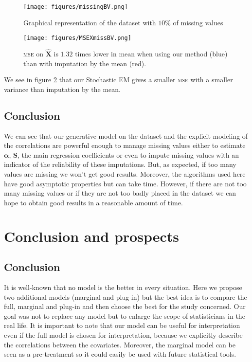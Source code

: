 \documentclass[12pt,a4paper]{report}
\begin{document}
	\begin{figure}[h!]
		\centering
		\texttt{[image: figures/missingBV.png]} 
		\caption{Graphical representation of the dataset with $10\%$ of missing values}\label{missingBV}
	\end{figure}
	\begin{figure}[h!]
		\centering
		\texttt{[image: figures/MSEXmissBV.png]} 
		\caption{\textsc{mse} on $\hat{\boldsymbol{X}}$ is $1.32$ times lower in mean when using our method (blue) than with imputation by the mean (red).}\label{MSEXmissBV}
	\end{figure}
	We see in figure \ref{MSEXmissBV} that our Stochastic EM gives a smaller \textsc{mse} with a smaller variance than imputation by the mean. 
	
\FloatBarrier	
\section{Conclusion}	We can see that our generative model on the dataset and the explicit modeling of the correlations are powerful enough to manage missing values either to estimate $\boldsymbol{\alpha}$, $\boldsymbol{S}$, the main regression coefficients or even to impute missing values with an indicator of the reliability of these imputations. But, as expected, 
 if too many values are missing we won't get good results. Moreover, the algorithms used here have good asymptotic properties but can take time.
 However, if there are not too many missing values or if they are not too badly placed in the dataset we can hope to obtain good results in a reasonable amount of time.\\


\chapter{Conclusion and prospects}
	\section{Conclusion}
		It is well-known that no model is the better in every situation. Here we propose two additional models (marginal and plug-in) but the best idea is to compare the full, marginal and plug-in and then choose the best for the study concerned. Our goal was not to replace any model but to enlarge the scope of statisticians in the real life. It is important to note that our model can be useful for interpretation even if the full model is chosen for interpretation, because we explicitly describe the correlations between the covariates. Moreover, the marginal model can be seen as a pre-treatment so it could easily be used with future statistical tools. \\
		
\end{document}
